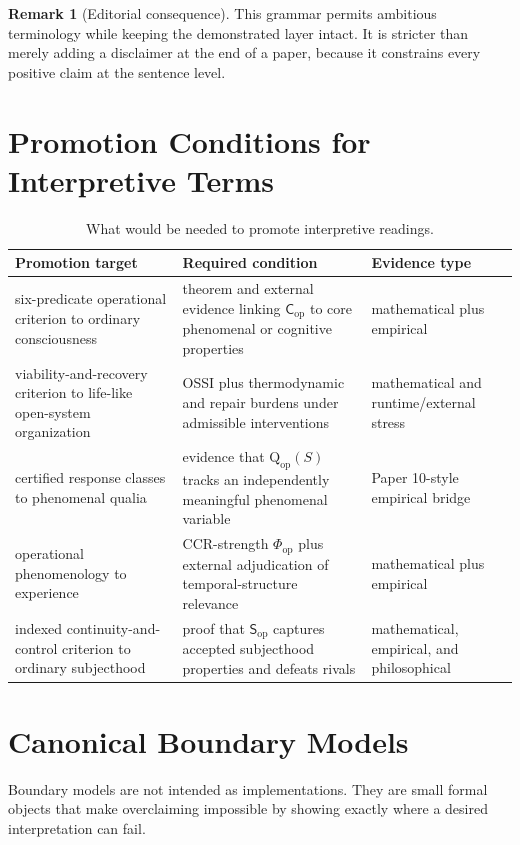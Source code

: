 \documentclass[11pt,a4paper]{article}
\theoremstyle{definition}
\newtheorem{remark}[theorem]{Remark}
\newcommand{\Cop}{\mathsf{C}_{\mathrm{op}}}
\newcommand{\Subop}{\mathsf{S}_{\mathrm{op}}}
\newcommand{\Qop}{\mathrm{Q}_{\mathrm{op}}}
\newcommand{\Phiop}{\Phi_{\mathrm{op}}}
\begin{document}
\begin{remark}[Editorial consequence]
This grammar permits ambitious terminology while keeping the demonstrated
layer intact. It is stricter than merely adding a disclaimer at the end of a
paper, because it constrains every positive claim at the sentence level.
\end{remark}

\section{Promotion Conditions for Interpretive Terms}

\begin{table}[ht]
\centering
\caption{What would be needed to promote interpretive readings.}
\label{tab:promotion-conditions}
\small
\begin{tabularx}{\textwidth}{>{\raggedright\arraybackslash}p{3.1cm} Y Y}
\toprule
Promotion target & Required condition & Evidence type \\
\midrule
six-predicate operational criterion to ordinary consciousness & theorem and external evidence linking $\Cop$ to core phenomenal or cognitive properties & mathematical plus empirical \\
viability-and-recovery criterion to life-like open-system organization & OSSI plus thermodynamic and repair burdens under admissible interventions & mathematical and runtime/external stress \\
certified response classes to phenomenal qualia & evidence that $\Qop(S)$ tracks an independently meaningful phenomenal variable & Paper 10-style empirical bridge \\
operational phenomenology to experience & CCR-strength $\Phiop$ plus external adjudication of temporal-structure relevance & mathematical plus empirical \\
indexed continuity-and-control criterion to ordinary subjecthood & proof that $\Subop$ captures accepted subjecthood properties and defeats rivals & mathematical, empirical, and philosophical \\
\bottomrule
\end{tabularx}
\end{table}

\section{Canonical Boundary Models}

Boundary models are not intended as implementations. They are small formal
objects that make overclaiming impossible by showing exactly where a desired
interpretation can fail.
\end{document}
